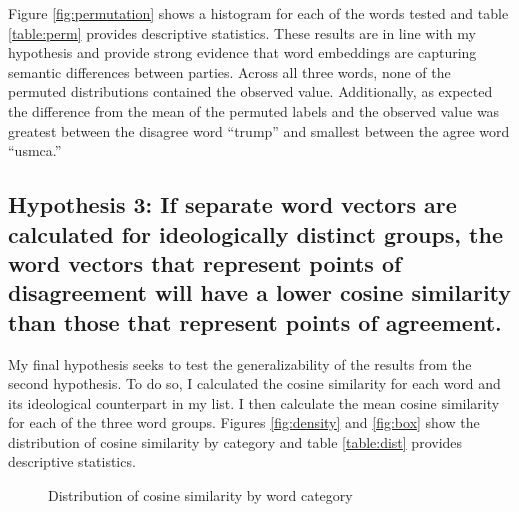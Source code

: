 \documentclass[../embeddings.tex]{subfiles}
\begin{document}
Figure \ref{fig:permutation} shows a histogram for each of the words tested and table \ref{table:perm} provides descriptive statistics. These results are in line with my hypothesis and provide strong evidence that word embeddings are capturing semantic differences between parties. Across all three words, none of the permuted distributions contained the observed value. Additionally, as expected the difference from the mean of the permuted labels and the observed value was greatest between the disagree word ``trump'' and smallest between the agree word ``usmca.''


\subsection{Hypothesis 3: If separate word vectors are calculated for ideologically distinct groups, the word vectors that represent points of disagreement will have a lower cosine similarity than those that represent points of agreement.}

My final hypothesis seeks to test the generalizability of the results from the second hypothesis. To do so, I calculated the cosine similarity for each word and its ideological counterpart in my list. I then calculate the mean cosine similarity for each of the three word groups. Figures \ref{fig:density} and \ref{fig:box} show the distribution of cosine similarity by category and table \ref{table:dist} provides descriptive statistics. 

\begin{figure} [h]
  \centering
  \qquad
  \caption{Distribution of cosine similarity by word category}
\end{figure}
\end{document}
